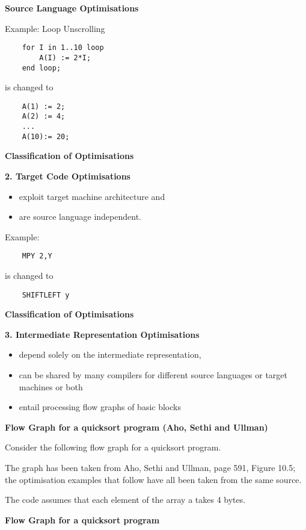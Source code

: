 %
%
\begin{slide}{}
{\bf Source Language Optimisations}

Example: Loop Unscrolling
\begin{verbatim}
    for I in 1..10 loop
        A(I) := 2*I;
    end loop;
\end{verbatim}
is changed to
\begin{verbatim}      
    A(1) := 2;
    A(2) := 4;
    ...
    A(10):= 20;
\end{verbatim}
\end{slide}
%
%
\begin{slide}{}
{\bf Classification of Optimisations}

{\bf 2. Target Code Optimisations}
    \begin{itemize}
    \item exploit target machine architecture and
    \item are source language independent.                     
    \end{itemize}

Example:
\begin{verbatim}
    MPY 2,Y
\end{verbatim}
is changed to
\begin{verbatim}
    SHIFTLEFT y
\end{verbatim}
\end{slide}
%
%
\begin{slide}{}
{\bf Classification of Optimisations}

{\bf 3. Intermediate Representation Optimisations}

\begin{itemize}
\item depend solely on the intermediate representation,
\item can be shared by many compilers for different source
      languages or target machines or both
\item entail processing flow graphs of basic blocks
\end{itemize}
\end{slide}
%
%
\begin{slide}{}
{\bf Flow Graph for a quicksort program (Aho, Sethi and Ullman)}

Consider the following flow graph for a quicksort program.

The graph has been taken from Aho, Sethi and Ullman, page 591,
Figure 10.5; the optimisation examples that follow have all been 
taken from the same source. 

The code assumes that each element of the array a takes 4 bytes. 
\end{slide}
%
%
\begin{slide}{}
{\bf Flow Graph for a quicksort program }

\vspace{3ex}

\end{slide}

